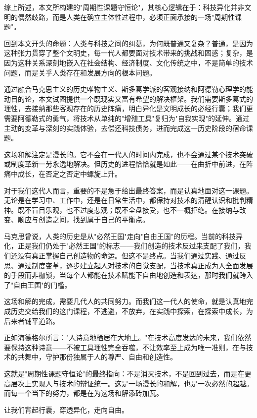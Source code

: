 \documentclass[a4paper,12pt]{ctexart}
\begin{document}
综上所述，本文所构建的"周期性课题守恒论"，其核心逻辑在于：科技异化并非文明的偶然歧路，而是人类在确立主体性过程中，必须正面承接的一场"周期性课题"。

回到本文开头的命题：人类与科技之间的纠葛，为何既普通又复杂？普通，是因为这种张力贯穿了整个文明史，每一代人都要面对技术带来的挑战和困惑；复杂，是因为这种关系深刻地嵌入在社会结构、经济制度、文化传统之中，不是简单的技术问题，而是关乎人类存在和发展方向的根本问题。

通过融合马克思主义的历史唯物主义、斯多葛学派的客观接纳和阿德勒心理学的能动目的论，本文试图提供一个既现实又富有希望的解决框架。我们需要斯多葛式的理性，去接纳那些客观存在的历史阵痛，明白异化是文明成长的必经行囊；我们更需要阿德勒式的勇气，将技术从单纯的"增殖工具"复归为"自我实现"的延伸。通过主动的变革与深刻的实践体验，去偿还科技债务，进而完成这一历史阶段的宿命课题。

这场和解注定是漫长的。它不会在一代人的时间内完成，也不会通过某个技术突破或制度革新一劳永逸地解决。但历史的进程恰恰就是如此——在曲折中前进，在阵痛中成长，在否定之否定中螺旋上升。

对于我们这代人而言，重要的不是急于给出最终答案，而是认真地面对这一课题。无论是在学习中、工作中，还是在日常生活中，都保持对技术的清醒认识和批判精神。既不盲目乐观，也不过度悲观；既不全盘接受，也不一概拒绝。在接纳与改变、顺应与创造之间，找到属于自己的平衡点。

马克思曾说，人类的历史是从"必然王国"走向"自由王国"的历程。当前的科技异化，正是我们仍处于"必然王国"的标志——我们创造的技术反过来支配了我们，我们还没有真正掌握自己创造物的命运。但这不是终点。当我们通过实践、通过反思、通过制度变革，逐步建立起人对技术的自觉支配，当技术真正成为人全面发展的手段而非枷锁，当每个人都能在技术赋能下自由地创造和表达，那时我们就跨入了"自由王国"的门槛。

这场和解的完成，需要几代人的共同努力。而我们这一代人的使命，就是认真地完成历史交给我们的这门课程，不逃避，不放弃，在实践中探索，在探索中成长，为后来者铺平道路。

正如海德格尔所言："人诗意地栖居在大地上。"在技术高度发达的未来，我们依然要保持这种诗意——不被工具理性完全吞噬，不让效率至上成为唯一准则，在与技术的共舞中，守护那份独属于人的尊严、自由和创造性。

这就是"周期性课题守恒论"的最终指向：不是消灭技术，不是回到过去，而是在更高层次上实现人与技术的辩证统一。这是一场漫长的和解，也是一次必然的超越。而每一个当下的努力，都是在为这场和解添砖加瓦。

让我们背起行囊，穿透异化，走向自由。
\end{document}
